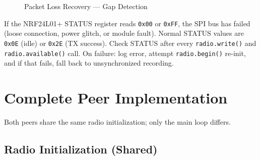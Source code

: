 \documentclass[11pt,a4paper]{article}
\begin{document}
\begin{figure}[htbp]
\begin{algorithm}[H]
\SetAlgoLined
{}
\caption{Packet Loss Recovery --- Gap Detection}
\label{alg:gap-detection}
\end{algorithm}
\end{figure}

\begin{dangerbox}
If the NRF24L01+ STATUS register reads \texttt{0x00} or \texttt{0xFF}, the SPI bus has failed (loose connection, power glitch, or module fault). Normal STATUS values are \texttt{0x0E} (idle) or \texttt{0x2E} (TX success). Check STATUS after every \texttt{radio.write()} and \texttt{radio.available()} call. On failure: log error, attempt \texttt{radio.begin()} re-init, and if that fails, fall back to unsynchronized recording.
\end{dangerbox}


\section{Complete Peer Implementation}

Both peers share the same radio initialization; only the main loop differs.

\subsection{Radio Initialization (Shared)}
\end{document}
